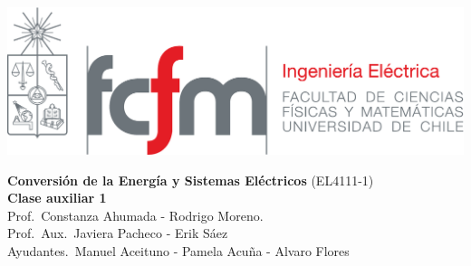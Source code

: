 \documentclass[
  11pt,
  letterpaper,
   addpoints,
   answers
  ]{exam}
\begin{document}
\noindent
\begin{minipage}{0.47\textwidth}
\includegraphics[width=\textwidth]{../fcfm_die}
\end{minipage}
\begin{minipage}{0.53\textwidth}
\begin{center} 
\large\textbf{Conversión de la Energía y Sistemas Eléctricos } (EL4111-1) \\
\large\textbf{Clase auxiliar 1} \\
\small Prof.~Constanza Ahumada - Rodrigo Moreno.\\
\small Prof.~Aux.~Javiera Pacheco - Erik Sáez\\
\small Ayudantes.~Manuel Aceituno - Pamela Acuña - Alvaro Flores\\
\end{center}
\end{minipage}

\vspace{0.5cm}
\noindent
\vspace{.85cm}
\end{document}
